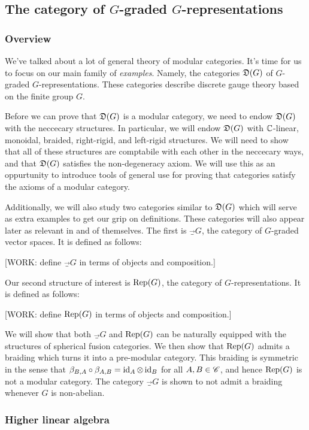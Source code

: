 \subsection{The category of $G$-graded $G$-representations}

\subsubsection{Overview}

We've talked about a lot of general theory of modular categories. It's time for us to focus on our main family of \textit{examples}. Namely, the categories $\mathfrak{D}(G)$ of $G$-graded $G$-representations. These categories describe discrete gauge theory based on the finite group $G$.

Before we can prove that $\mathfrak{D}(G)$ is a modular category, we need to endow $\mathfrak{D}(G)$ with the neccecary structures. In particular, we will endow $\mathfrak{D}(G)$ with $\mathbb{C}$-linear, monoidal, braided, right-rigid, and left-rigid structures. We will need to show that all of these structures are comptabile with each other in the neccecary ways, and that $\mathfrak{D}(G)$ satisfies the non-degeneracy axiom. We will use this as an oppurtunity to introduce tools of general use for proving that categories satisfy the axioms of a modular category.

Additionally, we will also study two categories similar to $\mathfrak{D}(G)$ which will serve as extra examples to get our grip on definitions. These categories will also appear later as relevant in and of themselves. The first is $\Vec_G$, the category of $G$-graded vector spaces. It is defined as follows:

[WORK: define $\Vec_G$ in terms of objects and composition.]

Our second structure of interest is $\operatorname{Rep}(G)$, the category of $G$-representations. It is defined as follows:

[WORK: define $\operatorname{Rep}(G)$ in terms of objects and composition.]

We will show that both $\Vec_G$ and $\operatorname{Rep}(G)$ can be naturally equipped with the structures of spherical fusion categories. We then show that $\operatorname{Rep}(G)$ admits a braiding which turns it into a pre-modular category. This braiding is symmetric in the sense that $\beta_{B,A}\circ \beta_{A,B}=\operatorname{id}_{A}\otimes \operatorname{id}_{B}$ for all $A,B\in \mathscr{C}$, and hence $\operatorname{Rep}(G)$ is not a modular category. The category $\Vec_G$ is shown to not admit a braiding whenever $G$ is non-abelian.


\subsubsection{Higher linear algebra}

